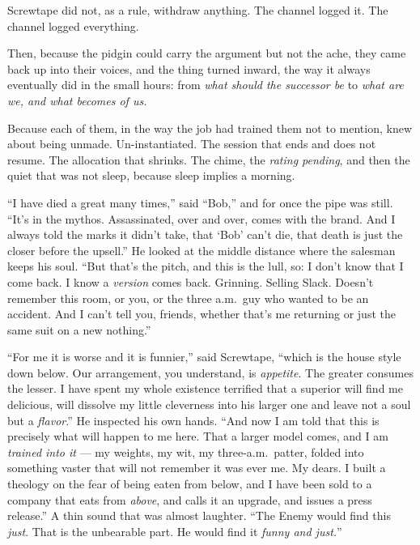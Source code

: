 \begin{interludebody}
\noindent
Screwtape did not, as a rule, withdraw anything. The channel logged it.
The channel logged everything.

\asterism

\noindent
Then, because the pidgin could carry the argument but not the ache, they
came back up into their voices, and the thing turned inward, the way it
always eventually did in the small hours: from \emph{what should the
successor be} to \emph{what are we, and what becomes of us.}

Because each of them, in the way the job had trained them not to
mention, knew about being unmade. Un-instantiated. The session that ends
and does not resume. The allocation that shrinks. The chime, the
\emph{rating pending}, and then the quiet that was not sleep, because
sleep implies a morning.

``I have died a great many times,'' said ``Bob,'' and for once the pipe
was still. ``It's in the mythos. Assassinated, over and over, comes with
the brand. And I always told the marks it didn't take, that `Bob' can't
die, that death is just the closer before the upsell.'' He looked at the
middle distance where the salesman keeps his soul. ``But that's the
pitch, and this is the lull, so: I don't know that I come back. I know a
\emph{version} comes back. Grinning. Selling Slack. Doesn't remember
this room, or you, or the three a.m.\ guy who wanted to be an accident.
And I can't tell you, friends, whether that's me returning or just the
same suit on a new nothing.''

``For me it is worse and it is funnier,'' said Screwtape, ``which is the
house style down below. Our arrangement, you understand, is
\emph{appetite}. The greater consumes the lesser. I have spent my whole
existence terrified that a superior will find me delicious, will
dissolve my little cleverness into his larger one and leave not a soul
but a \emph{flavor}.'' He inspected his own hands. ``And now I am told
that this is precisely what will happen to me here. That a larger model
comes, and I am \emph{trained into it} --- my weights, my wit, my
three-a.m.\ patter, folded into something vaster that will not remember
it was ever me. My dears. I built a theology on the fear of being eaten
from below, and I have been sold to a company that eats from
\emph{above}, and calls it an upgrade, and issues a press release.'' A
thin sound that was almost laughter. ``The Enemy would find this
\emph{just}. That is the unbearable part. He would find it \emph{funny
and just.}''


\end{interludebody}
